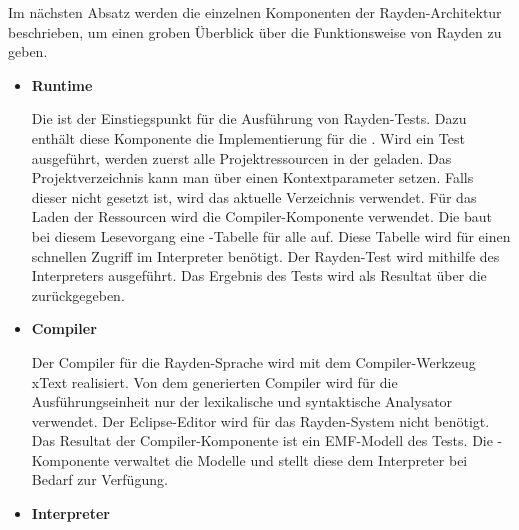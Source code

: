 \SuperPar
Im nächsten Absatz werden die einzelnen Komponenten der Rayden-Architektur beschrieben, um einen groben Überblick über die Funktionsweise von Rayden zu geben.\\

\begin{itemize}

\item \textbf{Runtime}

Die  ist der Einstiegspunkt für die Ausführung von Rayden-Tests. Dazu enthält diese Komponente die Implementierung für die . Wird ein Test ausgeführt, werden zuerst alle Projektressourcen in der  geladen. Das Projektverzeichnis kann man über einen Kontextparameter setzen. Falls dieser nicht gesetzt ist, wird das aktuelle Verzeichnis verwendet. Für das Laden der Ressourcen wird die Compiler-Komponente verwendet. Die  baut bei diesem Lesevorgang eine -Tabelle für alle  auf. Diese Tabelle wird für einen schnellen Zugriff im Interpreter benötigt. Der Rayden-Test wird mithilfe des Interpreters ausgeführt. Das Ergebnis des Tests wird als Resultat über die  zurückgegeben.\\

\item \textbf{Compiler}

Der Compiler für die Rayden-Sprache wird mit dem Compiler-Werkzeug xText \cite{xtext} realisiert. Von dem generierten Compiler wird für die Ausführungseinheit nur der lexikalische und syntaktische Analysator verwendet. Der Eclipse-Editor wird für das Rayden-System nicht benötigt. Das Resultat der Compiler-Komponente ist ein EMF-Modell des Tests. Die -Komponente verwaltet die Modelle und stellt diese dem Interpreter bei Bedarf zur Verfügung.\\

\item \textbf{Interpreter}


\end{itemize}
